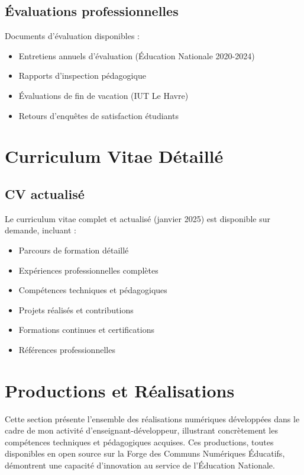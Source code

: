 \subsection{Évaluations professionnelles}
Documents d'évaluation disponibles :

\begin{itemize}[leftmargin=*]
    \item Entretiens annuels d'évaluation (Éducation Nationale 2020-2024)
    \item Rapports d'inspection pédagogique
    \item Évaluations de fin de vacation (IUT Le Havre)
    \item Retours d'enquêtes de satisfaction étudiants
\end{itemize}

\section{Curriculum Vitae Détaillé}

\subsection{CV actualisé}
Le curriculum vitae complet et actualisé (janvier 2025) est disponible sur demande, incluant :

\begin{itemize}[leftmargin=*]
    \item Parcours de formation détaillé
    \item Expériences professionnelles complètes
    \item Compétences techniques et pédagogiques
    \item Projets réalisés et contributions
    \item Formations continues et certifications
    \item Références professionnelles
\end{itemize}

\section{Productions et Réalisations}

Cette section présente l'ensemble des réalisations numériques développées dans le cadre de mon activité d'enseignant-développeur, illustrant concrètement les compétences techniques et pédagogiques acquises. Ces productions, toutes disponibles en open source sur la Forge des Communs Numériques Éducatifs, démontrent une capacité d'innovation au service de l'Éducation Nationale.


